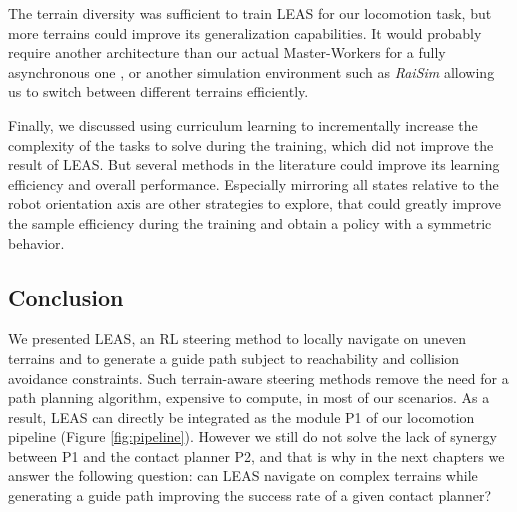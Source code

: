 The terrain diversity was sufficient to train LEAS for our locomotion task, but more terrains could improve its generalization capabilities. 
It would probably require another architecture than our actual Master-Workers for a fully asynchronous one \cite{impala2018, DD_PPO}, or another simulation environment such as \textit{RaiSim} \cite{raisim} allowing us to switch between different terrains efficiently.

Finally, we discussed using curriculum learning \cite{curriculum_learning_survey} to incrementally increase the complexity of the tasks to solve during the training, which did not improve the result of LEAS. But several methods in the literature could improve its learning efficiency and overall performance.
Especially mirroring all states relative to the robot orientation axis are other strategies to explore, that could greatly improve the sample efficiency during the training and obtain a policy with a symmetric behavior.


\subsection{Conclusion}
We presented LEAS, an RL steering method to locally navigate on uneven terrains and to generate a guide path subject to reachability and collision avoidance constraints. 
Such terrain-aware steering methods remove the need for a path planning algorithm, expensive to compute, in most of our scenarios.
As a result, LEAS can directly be integrated as the module P1 of our locomotion pipeline (Figure \ref{fig:pipeline}).
However we still do not solve the lack of synergy between P1 and the contact planner P2, and that is why in the next chapters we answer the following question: can LEAS navigate on complex terrains while generating a guide path improving the success rate of a given contact planner?
